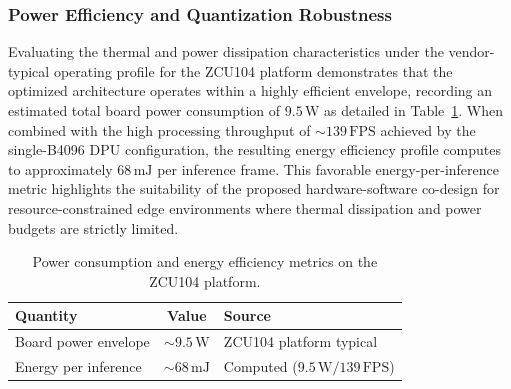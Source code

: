 \documentclass[algorithms,article,submit,moreauthors]{Definitions/mdpi}
\begin{document}
\subsubsection{Power Efficiency and Quantization Robustness}

Evaluating the thermal and power dissipation characteristics under the vendor-typical operating profile for the ZCU104 platform demonstrates that the optimized architecture operates within a highly efficient envelope, recording an estimated total board power consumption of $9.5\,\text{W}$ as detailed in Table~\ref{tab:power}. When combined with the high processing throughput of $\sim 139\,\text{FPS}$ achieved by the single-B4096 DPU configuration, the resulting energy efficiency profile computes to approximately $68\,\text{mJ}$ per inference frame. This favorable energy-per-inference metric highlights the suitability of the proposed hardware-software co-design for resource-constrained edge environments where thermal dissipation and power budgets are strictly limited.

\begin{table}[h!]
\centering
\caption{Power consumption and energy efficiency metrics on the ZCU104 platform.}
\label{tab:power}
\setlength{\tabcolsep}{6pt}\renewcommand{\arraystretch}{1.2}
\begin{tabular}{lcl}
\toprule
Quantity & Value & Source \\
\midrule
Board power envelope & $\sim 9.5\,\text{W}$ & ZCU104 platform typical \\
Energy per inference & $\sim 68\,\text{mJ}$ & Computed ($9.5\,\text{W} / 139\,\text{FPS}$) \\
\bottomrule
\end{tabular}
\end{table}
\end{document}

